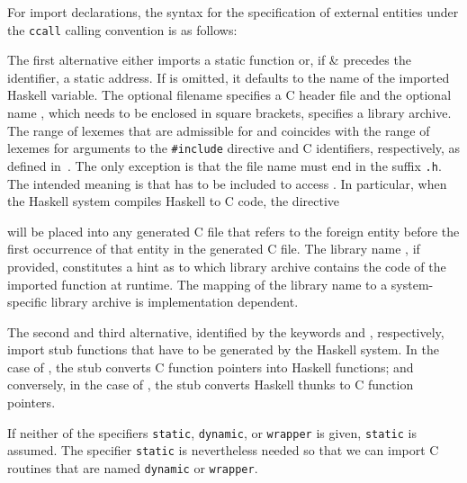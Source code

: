 \documentclass[a4paper,twoside]{article}
\newcommand{\code}[1]{\texttt{#1}}      %
\begin{document}
For import declarations, the syntax for the specification of external entities
under the \code{ccall} calling convention is as follows:
%
\begin{grammar}
  \grule{fname}{%
    \gverbal{file name with suffix `\code{.h}'}}
\end{grammar}
%
The first alternative either imports a static function  or, if
\gterm\& precedes the identifier, a static address.  If  is
omitted, it defaults to the name of the imported Haskell variable.  The
optional filename  specifies a C header file and the optional
name , which needs to be enclosed in square brackets, specifies a
library archive.  The range of lexemes that are admissible for 
and  coincides with the range of lexemes for arguments to the
\code{\#{}include} directive and C identifiers, respectively, as defined
in~\cite{C}.  The only exception is that the file name  must end
in the suffix \code{.h}.  The intended meaning is that  has to
be included to access .  In particular, when the Haskell system
compiles Haskell to C code, the directive
%
\begin{quote}
\end{quote}
%
will be placed into any generated C file that refers to the foreign entity
before the first occurrence of that entity in the generated C file.  The
library name , if provided, constitutes a hint as to which library
archive contains the code of the imported function at runtime.  The mapping of
the library name to a system-specific library archive is implementation
dependent.

The second and third alternative, identified by the keywords 
and , respectively, import stub functions that have to be
generated by the Haskell system.  In the case of , the stub
converts C function pointers into Haskell functions; and conversely, in the
case of , the stub converts Haskell thunks to C function
pointers.

If neither of the specifiers \code{static}, \code{dynamic}, or \code{wrapper}
is given, \code{static} is assumed.  The specifier \code{static} is
nevertheless needed so that we can import C routines that are named
\code{dynamic} or \code{wrapper}.
\end{document}
